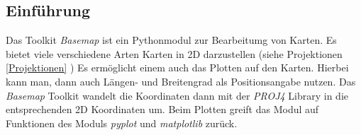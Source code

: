 \subsection{Einführung}
Das Toolkit \emph{Basemap} ist ein Pythonmodul zur Bearbeitumg von Karten.
Es bietet viele verschiedene Arten Karten in 2D darzustellen (siehe Projektionen \ref{Projektionen} )
Es ermöglicht einem auch das Plotten auf den Karten. Hierbei kann man, dann auch Längen- und Breitengrad als Positionsangabe nutzen. Das \emph{Basemap} Toolkit wandelt die Koordinaten dann mit der \emph{PROJ4} Library in die entsprechenden 2D Koordinaten um. Beim Plotten greift das Modul auf Funktionen des Moduls \emph{pyplot} und \emph{matplotlib} zurück.